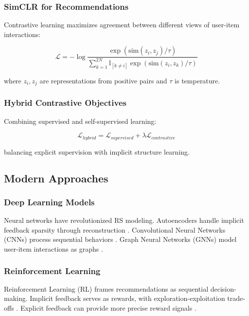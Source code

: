 \subsubsection{SimCLR for Recommendations}

Contrastive learning maximizes agreement between different views of user-item interactions:

\begin{equation}
\mathcal{L} = -\log \frac{\exp(\text{sim}(z_i, z_j)/\tau)}{\sum_{k=1}^{2N} \mathbb{I}_{[k \neq i]} \exp(\text{sim}(z_i, z_k)/\tau)}
\label{eq:contrastive}
\end{equation}

where $z_i, z_j$ are representations from positive pairs and $\tau$ is temperature.

\subsubsection{Hybrid Contrastive Objectives}

Combining supervised and self-supervised learning:

\begin{equation}
\mathcal{L}_{hybrid} = \mathcal{L}_{supervised} + \lambda \mathcal{L}_{contrastive}
\label{eq:hybrid_contrastive}
\end{equation}

balancing explicit supervision with implicit structure learning.

\subsection{Modern Approaches}

\subsubsection{Deep Learning Models}
Neural networks have revolutionized RS modeling. Autoencoders handle implicit feedback sparsity through reconstruction \cite{sedhain2015autorec}. Convolutional Neural Networks (CNNs) process sequential behaviors \cite{tang2018personalized}. Graph Neural Networks (GNNs) model user-item interactions as graphs \cite{wang2019neural}.

\subsubsection{Reinforcement Learning}
Reinforcement Learning (RL) frames recommendations as sequential decision-making. Implicit feedback serves as rewards, with exploration-exploitation trade-offs \cite{zhao2018recommendations}. Explicit feedback can provide more precise reward signals \cite{chen2019large}.

